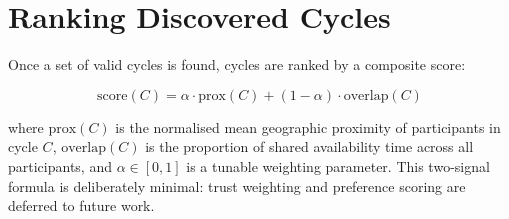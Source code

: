 \section{Ranking Discovered Cycles}

Once a set of valid cycles is found, cycles are ranked by a composite score:

\[
  \mathrm{score}(C) = \alpha \cdot \mathrm{prox}(C) + (1 - \alpha) \cdot \mathrm{overlap}(C)
\]

where $\mathrm{prox}(C)$ is the normalised mean geographic proximity of participants in
cycle $C$, $\mathrm{overlap}(C)$ is the proportion of shared availability time across all
participants, and $\alpha \in [0,1]$ is a tunable weighting parameter. This two-signal
formula is deliberately minimal: trust weighting and preference scoring are deferred to
future work.


